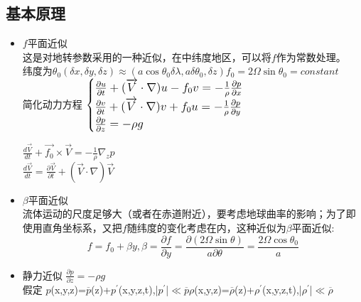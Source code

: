 \documentclass[cn, twoside]{myModel}
\begin{document}
		\subsection{\textcolor{blue!70!black}{基本原理}}
			\begin{itemize}
				\item \textbf{$f$}平面近似 \\
				这是对地转参数采用的一种近似，在中纬度地区，可以将$f$作为常数处理。 \\ 
			 	纬度为$\theta_{0}(\delta{x},\delta{y},\delta{z})\approx(a\cos{\theta_{0}}\delta\lambda, a\delta\theta_{0}, \delta{z})$\quad $f_{0}=2\Omega\sin{\theta_{0}}=constant$ \\ [.5em]简化动力方程
				$\left\{
				\begin{minipage}{7cm}
					\raggedright\large
					{$\frac{\partial u}{\partial t}+(\overrightarrow{V}\cdot\nabla)u-f_{0}v=-\frac{1}{\rho}\frac{\partial p}{\partial x}$} \\
					{$\frac{\partial v}{\partial t}+(\overrightarrow{V}\cdot\nabla)v+f_{0}u=-\frac{1}{\rho}\frac{\partial p}{\partial y}$} \\
					{$\frac{\partial p}{\partial z}=-\rho{g}$}
				\end{minipage}
				\right.$ 
				\begin{minipage}{7cm}
					\raggedright\large
					{$\frac{d\overrightarrow{V}}{dt}+\overrightarrow{f_{0}}\times\overrightarrow{V}=-\frac{1}{\rho}\nabla_{z}p$} \\
					$\frac{d\overrightarrow{V}}{dt}=\frac{\partial \overrightarrow{V}}{\partial t}+(\overrightarrow{V}\cdot\nabla)\overrightarrow{V}$
				\end{minipage}
			    \item $\beta$平面近似 \\
			    流体运动的尺度足够大（或者在赤道附近），要考虑地球曲率的影响；为了即使用直角坐标系，又把$f$随纬度的变化考虑在内，这种近似为$\beta$平面近似: 
			    $$
			    f=f_{0}+\beta{}y, \beta=\frac{\partial f}{\partial y}=\frac{\partial(2\Omega\sin{\theta})}{a\partial \theta}=\frac{2\Omega\cos{\theta_{0}}}{a}
			    $$
			    \item 静力近似 $\frac{\partial p}{\partial z}=-\rho{g}$ \\
			    假定 
			    $p$(x,y,z)=$\overline{p}$(z)+$p^{\prime}$(x,y,z,t),\enspace|$p^{\prime}$|$\ll$$\overline{p}$\quad $\rho$(x,y,z)=$\overline{\rho}$(z)+$\rho^{\prime}$(x,y,z,t),\enspace|$\rho^{\prime}$|$\ll$$\overline{\rho}$ \\
			    \begin{minipage}{6cm}

\end{minipage}
\end{itemize}
\end{document}
